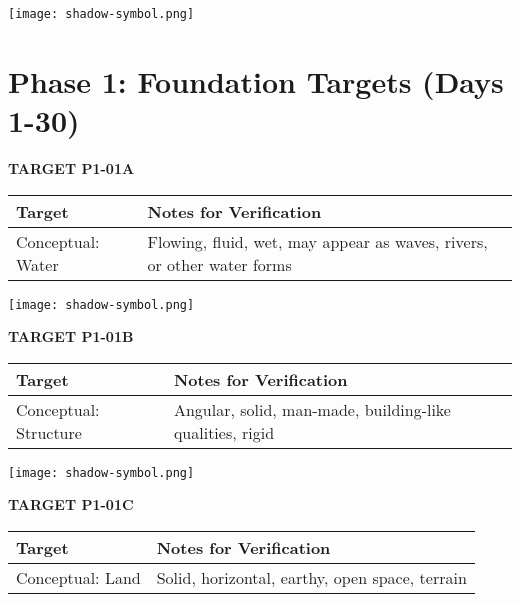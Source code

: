 \documentclass[10pt,twoside,final]{book} %
\makeatletter
\newcommand{\cleardoublepageWithSymbol}{%
  \clearpage %
  \if@twoside %
    \ifodd\c@page %
    \else %
      \thispagestyle{fancy} %
      \begingroup %
        \vspace*{0pt} %
        \vfill %
        \centering %
        \noindent 
        \texttt{[image: shadow-symbol.png]}
        \vfill %
      \endgroup
      \newpage    %
      \if@twocolumn\if@firstcolumn\else\hbox{}\newpage\fi\fi
    \fi
  \fi
}
\makeatother
\begin{document}
\cleardoublepageWithSymbol


\section*{Phase 1: Foundation Targets (Days 1-30)}

\label{target:P1-01A}
\begin{center}
\Large\textbf{TARGET P1-01A}
\end{center}
\begin{mdframed}[backgroundcolor=white, linewidth=0.7pt, linecolor=rvprimary, shadow=true, shadowsize=1pt, shadowcolor=graydark!40, roundcorner=3pt]
\begin{tabular}{|p{3.5cm}|p{9cm}|}
\hline
\rowcolor{rvprimary!15}
\textbf{Target} & \textbf{Notes for Verification} \\
\hline
Conceptual: Water & Flowing, fluid, wet, may appear as waves, rivers, or other water forms \\
\hline
\end{tabular}
\end{mdframed}


\cleardoublepageWithSymbol
\label{target:P1-01B}
\begin{center}
\Large\textbf{TARGET P1-01B}
\end{center}
\begin{mdframed}[backgroundcolor=white, linewidth=0.7pt, linecolor=rvprimary, shadow=true, shadowsize=1pt, shadowcolor=graydark!40, roundcorner=3pt]
\begin{tabular}{|p{3.5cm}|p{9cm}|}
\hline
\rowcolor{rvprimary!15}
\textbf{Target} & \textbf{Notes for Verification} \\
\hline
Conceptual: Structure & Angular, solid, man-made, building-like qualities, rigid \\
\hline
\end{tabular}
\end{mdframed}


\cleardoublepageWithSymbol
\label{target:P1-01C}
\begin{center}
\Large\textbf{TARGET P1-01C}
\end{center}
\begin{mdframed}[backgroundcolor=white, linewidth=0.7pt, linecolor=rvprimary, shadow=true, shadowsize=1pt, shadowcolor=graydark!40, roundcorner=3pt]
\begin{tabular}{|p{3.5cm}|p{9cm}|}
\hline
\rowcolor{rvprimary!15}
\textbf{Target} & \textbf{Notes for Verification} \\
\hline
Conceptual: Land & Solid, horizontal, earthy, open space, terrain \\
\hline
\end{tabular}
\end{mdframed}
\end{document}
